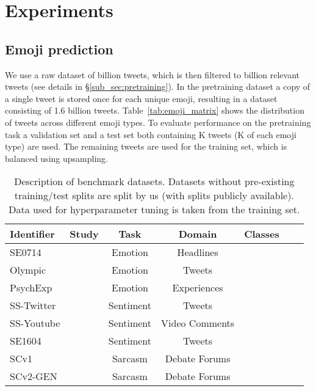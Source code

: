 \documentclass[11pt,a4paper]{article}
\begin{document}
\section{Experiments}
\label{sec:experiments}

\subsection{Emoji prediction}
\label{sub_sec:emoji_prediction}

We use a raw dataset of  billion tweets, which is then filtered to  billion relevant tweets (see details in \S\ref{sub_sec:pretraining}). In the pretraining dataset a copy of a single tweet is stored once for each unique emoji, resulting in a dataset consisting of 1.6 billion tweets. Table~\ref{tab:emoji_matrix} shows the distribution of tweets across different emoji types. To evaluate performance on the pretraining task a validation set and a test set both containing K tweets (K of each emoji type) are used. The remaining tweets are used for the training set, which is balanced using upsampling.


\begin{table*}[h]
\centering
\small
\caption{Description of benchmark datasets. Datasets without pre-existing training/test splits are split by us (with splits publicly available). Data used for hyperparameter tuning is taken from the training set.}
\label{tab:benchmark_dsets}
\begin{center}
\begin{tabular}{lcccccc}
\toprule
Identifier & Study & Task & Domain & Classes  &  &  \\
 \midrule
 SE0714  & \cite{strapparava2007semeval} & Emotion & Headlines &  &  &  \\
   Olympic  & \cite{sintsova2013fine} & Emotion & Tweets &   &  &  \\
  PsychExp  & \cite{wallbott1986universal} & Emotion & Experiences &  &  &  \\
 \midrule
 SS-Twitter  & \cite{thelwall2012sentiment} & Sentiment & Tweets &  &   &  \\
 SS-Youtube  & \cite{thelwall2012sentiment} & Sentiment & Video Comments &  &   &  \\
 SE1604  & \cite{nakov2016semeval} & Sentiment & Tweets &  &  &  \\
 \midrule
 SCv1 & \cite{walker2012corpus} & Sarcasm & Debate Forums &  &  &  \\ SCv2-GEN & \cite{oraby2016creating} & Sarcasm & Debate Forums &  &  &  \\ \bottomrule
\end{tabular}
\end{center}
\end{table*}
\end{document}

